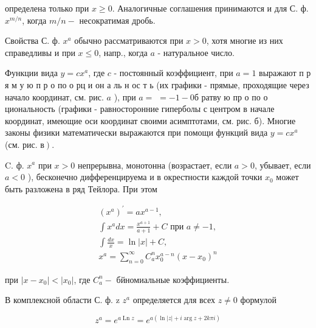\documentclass[10pt]{article}
\begin{document}
определена только при $x \geqslant 0$. Аналогичные соглашения принимаются и для С. ф. $x^{m / n}$, когда $m / n-$ несократимая дробь.



Свойства С. ф. $x^{a}$ обычно рассматриваются при $x>0$, хотя многие из них справедливы и при $x \leqslant 0$, напр., когда $a$ - натуральное число.



Функции вида $y=c x^{a}$, где $c$ - постоянный коэффициент, при $a=1$ выражают п р я м у ю п р о по о рц и он а ль н ос т ь (их графики - прямые, проходящие через начало координат, см. рис. $a$ ), при $a=$ $=-1-0 б$ ратву ю пр о по о циональность (графики - равносторонние гиперболы с центром в начале координат, имеющие оси координат своими асимптотами, см. рис. б). Многие законы физики математически выражаются при помощи функций вида $y=c x^{a}$ (см. рис. $\left.в\right)$.



C. ф. $x^{a}$ при $x>0$ непрерывна, монотонна (возрастает, если $a>0$, убывает, если $a<0$ ), бесконечно дифференцируема и в окрестности каждой точки $x_{0}$ может быть разложена в ряд Тейлора. При этом



\[

\begin{gathered}

\left(x^{a}\right)^{\prime}=a x^{a-1}, \\

\int x^{a} d x=\frac{x^{a+1}}{a+1}+C \text { при } a \neq-1, \\

\int \frac{d x}{x}=\ln |x|+C, \\

x^{a}=\sum_{n=0}^{\infty} C_{a}^{n} x_{0}^{a-n}\left(x-x_{0}\right)^{n}

\end{gathered}

\]



при $\left|x-x_{0}\right|<\left|x_{0}\right|$, где $C_{a}^{n}-$ бйномиальные коэффициенты.



В комплексной области С. ф. z $z^{a}$ определяется для всех $z \neq 0$ формулой



\[

z^{a}=e^{a \operatorname{Ln} z}=e^{a(\ln |z|+i \arg z+2 k \pi i)}

\]
\end{document}
